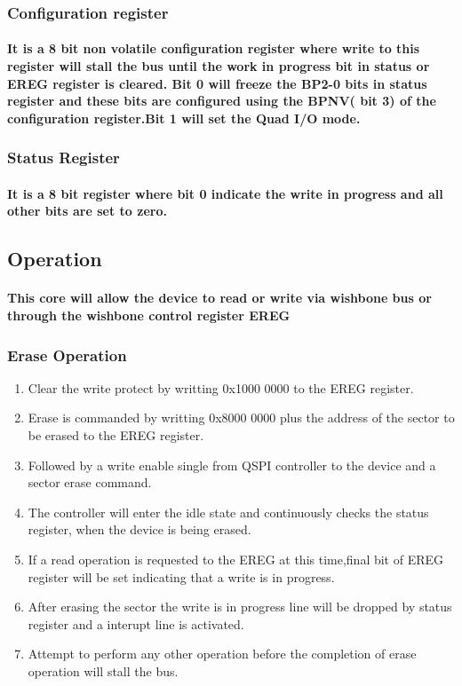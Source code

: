 \documentclass[12pt,a4paper]{report}
\begin{document}
\subsubsection{Configuration register}
\paragraph{\textrm{\textmd{ It is a 8 bit non volatile configuration register where write to this register will stall the bus until the work in progress bit in status or EREG register is cleared. Bit 0 will freeze the BP2-0 bits in status register and these bits are configured using the BPNV( bit 3) of the configuration register.Bit 1 will set the Quad I/O mode.}}}

\subsubsection{Status Register }
\paragraph{\textrm{\textmd{It is a 8 bit register where bit 0 indicate the write in progress and all other bits are set to zero.}}}





\subsection{Operation}
\paragraph{\textrm{\textmd{This core will allow the device to read or write via wishbone bus or through the wishbone control register EREG}}}

\subsubsection{Erase Operation }
\begin{enumerate}[font=$\bullet$\scshape\bfseries]
	\item []Clear the write protect by writting 0x1000 0000 to the EREG register.
	\item [] Erase is commanded by writting 0x8000 0000 plus the address of the sector to be erased to the EREG register.
	\item []Followed by a write enable single from QSPI controller to the device and a sector erase command.
	\item []The controller will enter the idle state and continuously checks the status register, when the device is being erased.
	\item []If a read operation is requested to the EREG at this time,final bit of EREG register will be set indicating that a write is in progress.
	\item []After erasing the sector the write is in progress line will be dropped by status register and a interupt line is activated.
	\item []Attempt to perform any other operation before the completion of erase operation will stall the bus.
\end{enumerate}
\end{document}
